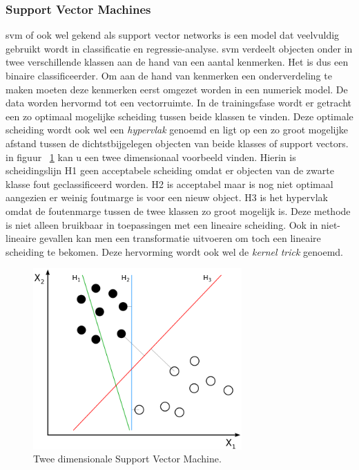 		
	
	
	\subsubsection{Support Vector Machines}
	\gls{svm} of ook wel gekend als support vector networks is een model dat veelvuldig gebruikt wordt in classificatie en regressie-analyse. \gls{svm} verdeelt objecten onder in twee verschillende klassen aan de hand van een aantal kenmerken. Het is dus een binaire classificeerder. Om aan de hand van kenmerken een onderverdeling te maken moeten deze kenmerken eerst omgezet worden in een numeriek model. De data worden hervormd tot een vectorruimte. In de trainingsfase wordt er getracht een zo optimaal mogelijke scheiding tussen beide klassen te vinden. Deze optimale scheiding wordt ook wel een \textit{hypervlak} genoemd en ligt op een zo groot mogelijke afstand tussen de dichtstbijgelegen objecten van beide klasses of support vectors. in figuur ~\ref{fig:supportVectorMachines} kan u een twee dimensionaal voorbeeld vinden. Hierin is scheidingslijn H1 geen acceptabele scheiding omdat er objecten van de zwarte klasse fout geclassificeerd worden. H2 is acceptabel maar is nog niet optimaal aangezien er weinig foutmarge is voor een nieuw object. H3 is het hypervlak omdat de foutenmarge tussen de twee klassen zo groot mogelijk is. Deze methode is niet alleen bruikbaar in toepassingen met een lineaire scheiding. Ook in niet-lineaire gevallen kan men een transformatie uitvoeren om toch een lineaire scheiding te bekomen. Deze hervorming wordt ook wel de \textit{kernel trick} genoemd. 
	
	
	\begin{figure}
		\centering
		\includegraphics[width=80mm]{afbeeldingen/supportVectorMachines.PNG}
		\caption{Twee dimensionale Support Vector Machine.\citep{bron:supportvectormachines}}
		\label{fig:supportVectorMachines}
	\end{figure}
		
